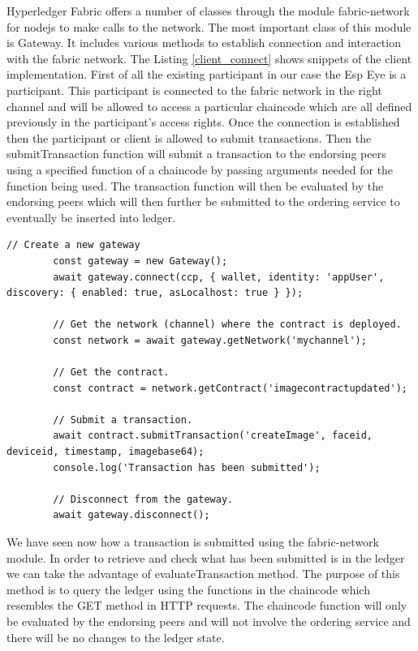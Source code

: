 Hyperledger Fabric offers a number of classes through the module {\selectfont fabric-network} for nodejs to make calls to the network. The most important class of this module is {\selectfont Gateway}. It includes various methods to establish connection and interaction with the fabric network. The Listing \ref{client_connect} shows snippets of the client implementation. First of all the existing participant in our case the Esp Eye is a participant. This participant is connected to the fabric network in the right channel and will be allowed to access a particular chaincode which are all defined previously in the participant's access rights. Once the connection is established then the participant or client is allowed to submit transactions. Then the {\selectfont submitTransaction} function will submit a transaction to the endorsing peers using a specified function of a chaincode by passing arguments needed for the function being used.  The transaction function will then be evaluated by the endorsing peers which will then further be submitted to the ordering service to eventually be inserted into ledger. 


\begin{lstlisting}[caption={Client establishing the connection and submitting a transaction.},label=client_connect, captionpos=b]
        // Create a new gateway 
        const gateway = new Gateway();
        await gateway.connect(ccp, { wallet, identity: 'appUser', discovery: { enabled: true, asLocalhost: true } });

        // Get the network (channel) where the contract is deployed.
        const network = await gateway.getNetwork('mychannel');

        // Get the contract.
        const contract = network.getContract('imagecontractupdated');

        // Submit a transaction.
        await contract.submitTransaction('createImage', faceid, deviceid, timestamp, imagebase64);
        console.log('Transaction has been submitted');

        // Disconnect from the gateway.
        await gateway.disconnect();
\end{lstlisting}

We have seen now how a transaction is submitted using the {\selectfont fabric-network} module. In order to retrieve and check what has been submitted is in the ledger we can take the advantage of {\selectfont evaluateTransaction} method. The purpose of this method is to query the ledger using the functions in the chaincode which resembles the GET method in HTTP requests. The chaincode function will only be evaluated by the endorsing peers and will not involve the ordering service and there will be no changes to the ledger state. 

